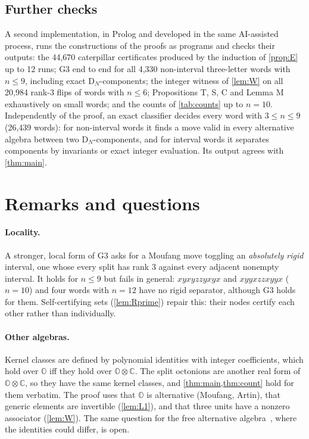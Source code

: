 \documentclass[11pt,a4paper]{article}
\theoremstyle{definition}
\theoremstyle{remark}
\newcommand{\OO}{\mathbb{O}}
\newcommand{\CC}{\mathbb{C}}
\newcommand{\DN}{\mathrm{D}_N}
\begin{document}
\subsection{Further checks}\label{sec:checks}
A second implementation, in Prolog and developed in the same AI-assisted process, runs the
constructions of the proofs as programs and checks their outputs: the 44{,}670 caterpillar certificates
produced by the induction of \cref{prop:E} up to 12 runs; G3 end to end for all 4{,}330 non-interval
three-letter words with $n\le9$, including exact $\DN$-components; the integer witness of \cref{lem:W}
on all 20{,}984 rank-$3$ flips of words with $n\le6$; Propositions T, S, C and Lemma M exhaustively on
small words; and the counts of \cref{tab:counts} up to $n=10$. Independently of the proof, an exact
classifier decides every word with $3\le n\le9$ (26{,}439 words): for non-interval words it finds a move
valid in every alternative algebra between two $\DN$-components, and for interval words it separates
components by invariants or exact integer evaluation. Its output agrees with \cref{thm:main}.

\section{Remarks and questions}\label{sec:remarks}

\paragraph{Locality.} A stronger, local form of G3 asks for a Moufang move toggling an
\emph{absolutely rigid} interval, one whose every split has rank $3$ against every adjacent nonempty
interval. It holds for $n\le9$ but fails in general: $xyxyzzyxyx$ and $xyyxzzxyyx$ ($n=10$) and four words
with $n=12$ have no rigid separator, although G3 holds for them. Self-certifying sets
(\cref{lem:Rprime}) repair this: their nodes certify each other rather than individually.

\paragraph{Other algebras.} Kernel classes are defined by polynomial identities with integer
coefficients, which hold over $\OO$ iff they hold over $\OO\otimes\CC$. The split octonions are another
real form of $\OO\otimes\CC$, so they have the same kernel classes, and \cref{thm:main,thm:count} hold
for them verbatim. The proof uses that $\OO$ is alternative (Moufang, Artin), that generic elements are
invertible (\cref{lem:L1}), and that three units have a nonzero associator (\cref{lem:W}). The same
question for the free alternative algebra~\cite{ZSSS82}, where the identities could differ, is open.
\end{document}

